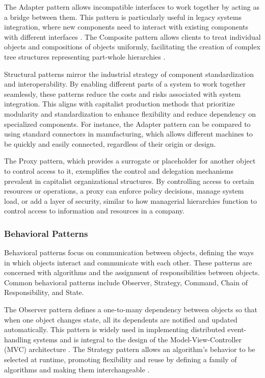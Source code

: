 \begin{refsection}
The Adapter pattern allows incompatible interfaces to work together by acting as a bridge between them. This pattern is particularly useful in legacy systems integration, where new components need to interact with existing components with different interfaces \cite[pp.~139-142]{Gamma2015}. The Composite pattern allows clients to treat individual objects and compositions of objects uniformly, facilitating the creation of complex tree structures representing part-whole hierarchies \cite[pp.~163-165]{Gamma2015}.

Structural patterns mirror the industrial strategy of component standardization and interoperability. By enabling different parts of a system to work together seamlessly, these patterns reduce the costs and risks associated with system integration. This aligns with capitalist production methods that prioritize modularity and standardization to enhance flexibility and reduce dependency on specialized components. For instance, the Adapter pattern can be compared to using standard connectors in manufacturing, which allows different machines to be quickly and easily connected, regardless of their origin or design.

The Proxy pattern, which provides a surrogate or placeholder for another object to control access to it, exemplifies the control and delegation mechanisms prevalent in capitalist organizational structures. By controlling access to certain resources or operations, a proxy can enforce policy decisions, manage system load, or add a layer of security, similar to how managerial hierarchies function to control access to information and resources in a company.

\subsubsection{Behavioral Patterns}

Behavioral patterns focus on communication between objects, defining the ways in which objects interact and communicate with each other. These patterns are concerned with algorithms and the assignment of responsibilities between objects. Common behavioral patterns include Observer, Strategy, Command, Chain of Responsibility, and State.

The Observer pattern defines a one-to-many dependency between objects so that when one object changes state, all its dependents are notified and updated automatically. This pattern is widely used in implementing distributed event-handling systems and is integral to the design of the Model-View-Controller (MVC) architecture \cite[pp.~291-294]{Gamma2015}. The Strategy pattern allows an algorithm's behavior to be selected at runtime, promoting flexibility and reuse by defining a family of algorithms and making them interchangeable \cite[pp.~315-318]{Gamma2015}.


\end{refsection}
